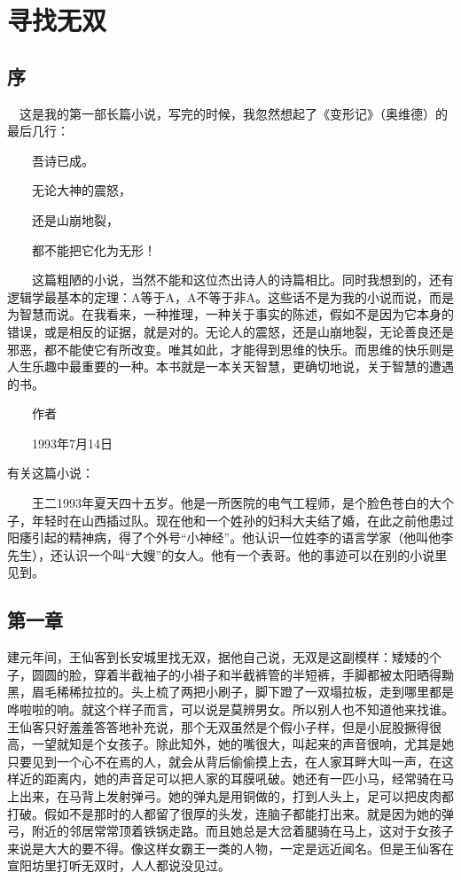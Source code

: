 \chapter{寻找无双}

\section{序}

　这是我的第一部长篇小说，写完的时候，我忽然想起了《变形记》（奥维德）的最后几行： 

　　吾诗已成。 

　　无论大神的震怒， 

　　还是山崩地裂， 

　　都不能把它化为无形！ 

　　这篇粗陋的小说，当然不能和这位杰出诗人的诗篇相比。同时我想到的，还有逻辑学最基本的定理：A等于A，A不等于非A。这些话不是为我的小说而说，而是为智慧而说。在我看来，一种推理，一种关于事实的陈述，假如不是因为它本身的错误，或是相反的证据，就是对的。无论人的震怒，还是山崩地裂，无论善良还是邪恶，都不能使它有所改变。唯其如此，才能得到思维的快乐。而思维的快乐则是人生乐趣中最重要的一种。本书就是一本关天智慧，更确切地说，关于智慧的遭遇的书。 

　　作者 

　　1993年7月14日 

有关这篇小说： 

　　王二1993年夏天四十五岁。他是一所医院的电气工程师，是个脸色苍白的大个子，年轻时在山西插过队。现在他和一个姓孙的妇科大夫结了婚，在此之前他患过阳痿引起的精神病，得了个外号“小神经”。他认识一位姓李的语言学家（他叫他李先生），还认识一个叫“大嫂”的女人。他有一个表哥。他的事迹可以在别的小说里见到。

\section{第一章}

建元年间，王仙客到长安城里找无双，据他自己说，无双是这副模样：矮矮的个子，圆圆的脸，穿着半截袖子的小褂子和半截裤管的半短裤，手脚都被太阳晒得黝黑，眉毛稀稀拉拉的。头上梳了两把小刷子，脚下蹬了一双塌拉板，走到哪里都是哗啦啦的响。就这个样子而言，可以说是莫辨男女。所以别人也不知道他来找谁。王仙客只好羞羞答答地补充说，那个无双虽然是个假小子样，但是小屁股撅得很高，一望就知是个女孩子。除此知外，她的嘴很大，叫起来的声音很响，尤其是她只要见到一个心不在焉的人，就会从背后偷偷摸上去，在人家耳畔大叫一声，在这样近的距离内，她的声音足可以把人家的耳膜吼破。她还有一匹小马，经常骑在马上出来，在马背上发射弹弓。她的弹丸是用铜做的，打到人头上，足可以把皮肉都打破。假如不是那时的人都留了很厚的头发，连脑子都能打出来。就是因为她的弹弓，附近的邻居常常顶着铁锅走路。而且她总是大岔着腿骑在马上，这对于女孩子来说是大大的要不得。像这样女霸王一类的人物，一定是远近闻名。但是王仙客在宣阳坊里打听无双时，人人都说没见过。 


